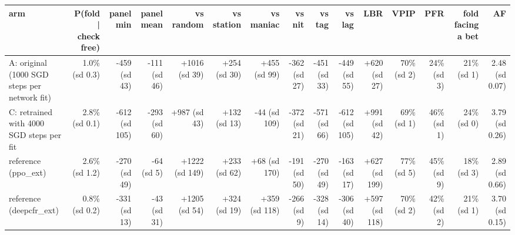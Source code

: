 \begin{tabular}{lrrrrrrrrrrrrrr}
\toprule
arm & P(fold | check free) & panel min & panel mean & vs random & vs station & vs maniac & vs nit & vs tag & vs lag & LBR & VPIP & PFR & fold facing a bet & AF \\
\midrule
A: original (1000 SGD steps per network fit) & 1.0\% (sd 0.3) & -459 (sd 43) & -111 (sd 46) & +1016 (sd 39) & +254 (sd 30) & +455 (sd 99) & -362 (sd 27) & -451 (sd 33) & -449 (sd 55) & +620 (sd 27) & 70\% (sd 2) & 24\% (sd 3) & 21\% (sd 1) & 2.48 (sd 0.07) \\
C: retrained with 4000 SGD steps per fit & 2.8\% (sd 0.1) & -612 (sd 105) & -293 (sd 60) & +987 (sd 43) & +132 (sd 13) & -44 (sd 109) & -372 (sd 21) & -571 (sd 66) & -612 (sd 105) & +991 (sd 42) & 69\% (sd 1) & 46\% (sd 1) & 24\% (sd 0) & 3.79 (sd 0.26) \\
reference (ppo\_ext) & 2.6\% (sd 1.2) & -270 (sd 49) & -64 (sd 5) & +1222 (sd 149) & +233 (sd 62) & +68 (sd 170) & -191 (sd 50) & -270 (sd 49) & -163 (sd 17) & +627 (sd 199) & 77\% (sd 5) & 45\% (sd 9) & 18\% (sd 3) & 2.89 (sd 0.66) \\
reference (deepcfr\_ext) & 0.8\% (sd 0.2) & -331 (sd 13) & -43 (sd 31) & +1205 (sd 54) & +324 (sd 19) & +359 (sd 118) & -266 (sd 9) & -328 (sd 14) & -306 (sd 40) & +597 (sd 118) & 70\% (sd 2) & 42\% (sd 2) & 21\% (sd 1) & 3.70 (sd 0.15) \\
\bottomrule
\end{tabular}
